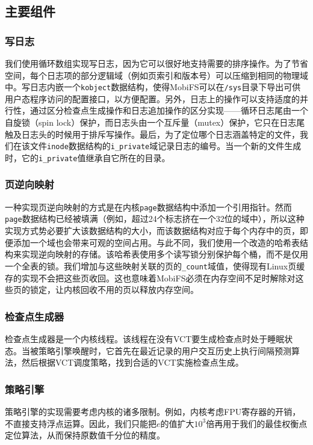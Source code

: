 \subsection{主要组件}
\label{vct:data-struct}

\subsubsection{写日志}
我们使用循环数组实现写日志，因为它可以很好地支持需要的排序操作。为了节省空间，每个日志项的部分逻辑域（例如页索引和版本号）可以压缩到相同的物理域中。写日志内嵌一个\texttt{kobject}数据结构，使得MobiFS可以在\texttt{/sys}目录下导出可供用户态程序访问的配置接口，以方便配置。另外，日志上的操作可以支持适度的并行性，通过区分检查点生成操作和日志追加操作的区分实现——循环日志尾由一个自旋锁（spin lock）保护，而日志头由一个互斥量（mutex）保护，它只在日志尾触及日志头的时候用于排斥写操作。最后，为了定位哪个日志涵盖特定的文件，我们在该文件\texttt{inode}数据结构的\texttt{i\_private}域记录日志的编号。当一个新的文件生成时，它的\texttt{i\_private}值继承自它所在的目录。

\subsubsection{页逆向映射} 
一种实现页逆向映射的方式是在内核\texttt{page}数据结构中添加一个引用指针。然而\texttt{page}数据结构已经被填满（例如，超过24个标志挤在一个32位的域中），所以这种实现方式势必要扩大该数据结构的大小，而该数据结构对应于每个内存中的页，即便添加一个域也会带来可观的空间占用。与此不同，我们使用一个改造的哈希表结构来实现逆向映射的存储。该哈希表使用多个读写锁分别保护每个桶，而不是仅用一个全表的锁。我们增加与这些映射关联的页的\texttt{\_count}域值，使得现有Linux页缓存的实现不会把这些页收回。这也意味着MobiFS必须在内存空间不足时解除对这些页的锁定，让内核回收不用的页以释放内存空间。

\subsubsection{检查点生成器}
检查点生成器是一个内核线程。该线程在没有VCT要生成检查点时处于睡眠状态。当被策略引擎唤醒时，它首先在最近记录的用户交互历史上执行间隔预测算法，然后根据VCT调度策略，找到合适的VCT实施检查点生成。

\subsubsection{策略引擎}
策略引擎的实现需要考虑内核的诸多限制。例如，内核考虑FPU寄存器的开销，不直接支持浮点运算。因此，我们只能把$e$的值扩大$10^3$倍再用于我们的最佳权衡点定位算法，从而保持原数值千分位的精度。

